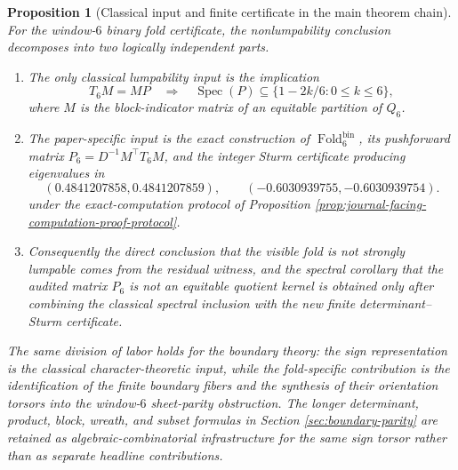 \documentclass[12pt,a4paper]{article}
\theoremstyle{plain}
\newtheorem{proposition}[theorem]{Proposition}
\theoremstyle{definition}
\numberwithin{equation}{section}
\DeclareMathOperator{\Spec}{Spec}
\newcommand{\Fold}{\operatorname{Fold}}
\begin{document}
\begin{proposition}[Classical input and finite certificate in the main theorem chain]\label{prop:classical-certificate-interface-main-chain}
For the window-\(6\) binary fold certificate, the nonlumpability conclusion decomposes into two logically independent parts.
\begin{enumerate}[label=\textup{(\roman*)}]
\item The only classical lumpability input is the implication
\[
T_6M=MP\quad\Longrightarrow\quad
\Spec(P)\subseteq\{1-2k/6:0\le k\le 6\},
\]
where \(M\) is the block-indicator matrix of an equitable partition of \(Q_6\).
\item The paper-specific input is the exact construction of \(\Fold_6^{\mathrm{bin}}\), its pushforward matrix \(P_6=D^{-1}M^\top T_6M\), and the integer Sturm certificate producing eigenvalues in
\[
(0.4841207858,0.4841207859),
\qquad
(-0.6030939755,-0.6030939754).
\]
under the exact-computation protocol of Proposition \ref{prop:journal-facing-computation-proof-protocol}.
\item Consequently the direct conclusion that the visible fold is not strongly lumpable comes from the residual witness, and the spectral corollary that the audited matrix \(P_6\) is not an equitable quotient kernel is obtained only after combining the classical spectral inclusion with the new finite determinant--Sturm certificate.
\end{enumerate}
The same division of labor holds for the boundary theory: the sign representation is the classical character-theoretic input, while the fold-specific contribution is the identification of the finite boundary fibers and the synthesis of their orientation torsors into the window-\(6\) sheet-parity obstruction.  The longer determinant, product, block, wreath, and subset formulas in Section \ref{sec:boundary-parity} are retained as algebraic-combinatorial infrastructure for the same sign torsor rather than as separate headline contributions. \qedhere
\end{proposition}
\end{document}
